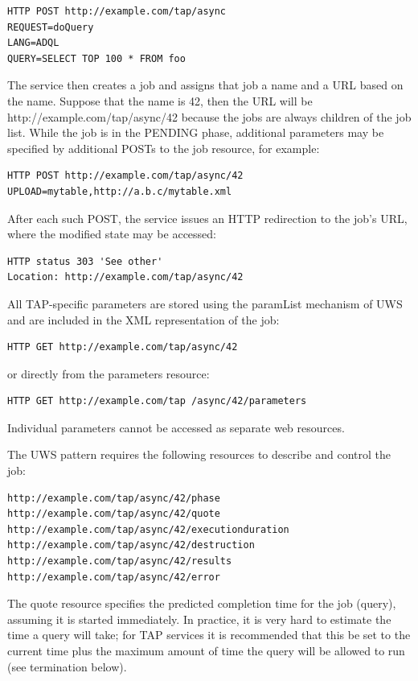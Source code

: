 \documentclass[11pt,letter]{ivoa}
\begin{document}
{\begin{verbatim}
HTTP POST http://example.com/tap/async
REQUEST=doQuery
LANG=ADQL
QUERY=SELECT TOP 100 * FROM foo
\end{verbatim}

The service then creates a job and assigns that job a name and a URL based on 
the name. Suppose that the name is 42, then the URL will be 
http://example.com/tap/async/42 because the jobs are always children of the job 
list. While the job is in the PENDING phase, additional parameters may be 
specified by additional POSTs to the job resource, for example:

\begin{verbatim}
HTTP POST http://example.com/tap/async/42
UPLOAD=mytable,http://a.b.c/mytable.xml
\end{verbatim}

After each such POST, the service issues an HTTP redirection to the job's URL, 
where the modified state may be accessed:

\begin{verbatim}
HTTP status 303 'See other'
Location: http://example.com/tap/async/42
\end{verbatim}

All TAP-specific parameters are stored using the paramList mechanism of UWS and 
are included in the XML representation of the job:
\begin{verbatim}
HTTP GET http://example.com/tap/async/42
\end{verbatim}
or directly from the parameters resource:
\begin{verbatim}
HTTP GET http://example.com/tap /async/42/parameters
\end{verbatim}
Individual parameters cannot be accessed as separate web resources.

The UWS pattern requires the following resources to describe and control the 
job:
\begin{verbatim}
http://example.com/tap/async/42/phase
http://example.com/tap/async/42/quote
http://example.com/tap/async/42/executionduration
http://example.com/tap/async/42/destruction
http://example.com/tap/async/42/results
http://example.com/tap/async/42/error
\end{verbatim}
The quote resource specifies the predicted completion time for the job (query), 
assuming it is started immediately. In practice, it is very hard to estimate the 
time a query will take; for TAP services it is recommended that this be set to 
the current time plus the maximum amount of time the query will be allowed to 
run (see termination below). 

}
\end{document}
